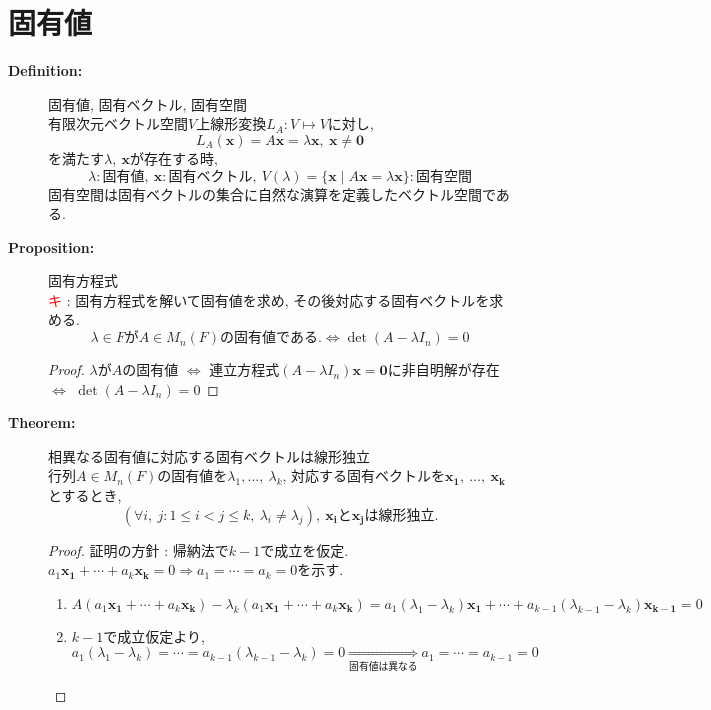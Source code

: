 \documentclass[dvipdfmx]{jsarticle}
\newcommand*{\point}{\textcircled{\textcolor{red}{\scriptsize キ}} }
\begin{document}
\section{固有値}
\begin{description}
    \item[\bf{Definition:}] 固有値, 固有ベクトル, 固有空間 \\
    有限次元ベクトル空間$V$上線形変換$L_A : V \mapsto V$に対し, 
        $$ L_A(\bm{x}) = A \bm{x} = \lambda \bm{x},\ \bm{x} \neq \bm{0}$$
    を満たす$\lambda,\ \bm{x}$が存在する時, 
        $$ \lambda : \text{固有値},\ \bm{x} : \text{固有ベクトル},\ V(\lambda) = \{ \bm{x} \mid A \bm{x} = \lambda \bm{x} \} : \text{固有空間} $$
    固有空間は固有ベクトルの集合に自然な演算を定義したベクトル空間である.

    \item[\bf{Proposition:}] 固有方程式 \\
        \point : 固有方程式を解いて固有値を求め, その後対応する固有ベクトルを求める.
        $$ \lambda \in F \text{が} A \in M_n(F) \text{の固有値である.} \Leftrightarrow \det (A - \lambda I_n) = 0 $$
        \begin{proof}
            $\lambda$が$A$の固有値 $\Leftrightarrow$ 連立方程式$(A - \lambda I_n)\bm{x} = \bm{0}$に非自明解が存在 $\Leftrightarrow$ $\det (A - \lambda I_n) = 0$
        \end{proof}
    
    \item[\bf{Theorem:}] 相異なる固有値に対応する固有ベクトルは線形独立 \\
        行列$A \in M_n(F)$の固有値を$ \lambda_1, \dots,\ \lambda_k $, 対応する固有ベクトルを$\bm{x_1},\ \dots,\ \bm{x_k}$ とするとき, 
        $$ (\forall i,\ j : 1 \leq i < j \leq k,\ \lambda_i \neq \lambda_j),\ \bm{x_i} \text{と} \bm{x_j} \text{は線形独立.}  $$
        \begin{proof} 証明の方針 : 帰納法で$k-1$で成立を仮定. $ a_1 \bm{x_1} + \cdots +a_k \bm{x_{k}} = 0 \Rightarrow a_1 = \cdots = a_k = 0$を示す.
            \begin{enumerate}
                \item $ A (a_1 \bm{x_1} + \cdots +a_k \bm{x_{k}}) - \lambda_k(a_1 \bm{x_1} + \cdots +a_k \bm{x_{k}}) = a_1 (\lambda_1-\lambda_k) \bm{x_1} + \cdots + a_{k-1} (\lambda_{k-1} - \lambda_k) \bm{x_{k-1}} = 0$
                \item $k-1$で成立仮定より, $a_1(\lambda_1-\lambda_k) = \cdots = a_{k-1}(\lambda_{k-1}-\lambda_k)=0 \underset{固有値は異なる}{\Rightarrow} a_1 = \cdots = a_{k-1} = 0$
            \end{enumerate}
        \end{proof}
    

\end{description}
\end{document}
